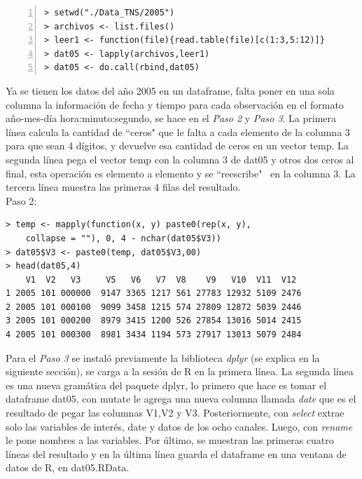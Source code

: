 \begin{mybox}
\begin{Verbatim}[numbers=left,xleftmargin=5mm]
> setwd("./Data_TNS/2005")
> archivos <- list.files()
> leer1 <- function(file){read.table(file)[c(1:3,5:12)]}
> dat05 <- lapply(archivos,leer1)
> dat05 <- do.call(rbind,dat05)
\end{Verbatim}
\end{mybox}

Ya se tienen los datos del año 2005 en un dataframe, falta poner en una sola columna la información de fecha y tiempo para cada observación en el formato año-mes-día hora:minuto:segundo, se hace en el \emph{Paso 2} y \emph{Paso 3}. La primera línea calcula la cantidad de ``ceros" que le falta a cada elemento de la columna 3 para que sean 4 dígitos, y devuelve esa cantidad de ceros en un vector temp. La segunda línea pega el vector temp con la columna 3 de dat05 y otros dos ceros al final, esta operación es elemento a elemento y se ``reescribe" \, en la columna 3. La tercera línea muestra las primeras 4 filas del resultado.\\

Paso 2:
\begin{mybox}
\begin{verbatim}
> temp <- mapply(function(x, y) paste0(rep(x, y), 
	collapse = ""), 0, 4 - nchar(dat05$V3))
> dat05$V3 <- paste0(temp, dat05$V3,00)
> head(dat05,4)
    V1  V2   V3     V5   V6   V7  V8    V9   V10  V11  V12
1 2005 101 000000  9147 3365 1217 561 27783 12932 5109 2476
2 2005 101 000100  9099 3458 1215 574 27809 12872 5039 2446
3 2005 101 000200  8979 3415 1200 526 27854 13016 5014 2415
4 2005 101 000300  8981 3434 1194 573 27917 13013 5079 2484
\end{verbatim}
\end{mybox}

Para el \emph{Paso 3} se instaló previamente la biblioteca \emph{dplyr} (se explica en la siguiente sección), se carga a la sesión de R en la primera línea. La segunda línea es una nueva gramática del paquete dplyr, lo primero que hace es tomar el dataframe dat05, con mutate le agrega una nueva columna llamada \emph{date} que es el resultado de pegar las columnas V1,V2 y V3. Posteriormente, con \emph{select} extrae solo las variables de interés, date y datos de los ocho canales. Luego, con \emph{rename} le pone nombres a las variables. Por último, se muestran las primeras cuatro líneas del resultado y en la última línea guarda el dataframe en una ventana de datos de R, en dat05.RData.\\

